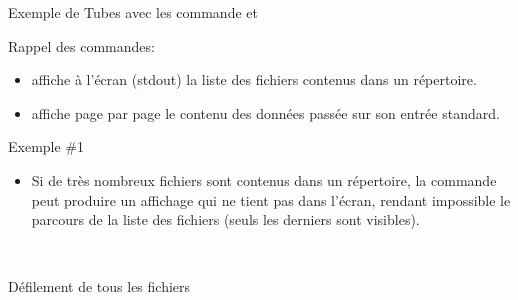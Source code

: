 \begin{frame}{Exemple de Tubes avec les commande  et }
  \begin{block}{Rappel des commandes:}
    \begin{itemize}
    \item {} affiche à l'écran (stdout) la liste des fichiers
      contenus dans un répertoire.
    \item {} affiche page par page le contenu des données passée
      sur son entrée standard.
    \end{itemize}
  \end{block}
  \begin{alertblock}{Exemple \#1}
    \begin{itemize}
    \item Si de très nombreux fichiers sont contenus dans un répertoire,
      la commande  peut produire un affichage qui ne tient pas
      dans l'écran, rendant impossible le parcours de la liste des
      fichiers (seuls les derniers sont visibles).
    \end{itemize}
    \begin{columns}
      \begin{column}{6cm}
        \small{ \\\vspace{5pt} Défilement de tous les
          fichiers\\\vspace{5pt}  }
      \end{column}
      \begin{column}{6cm}
      \end{column}
    \end{columns}
  \end{alertblock}
\end{frame}



